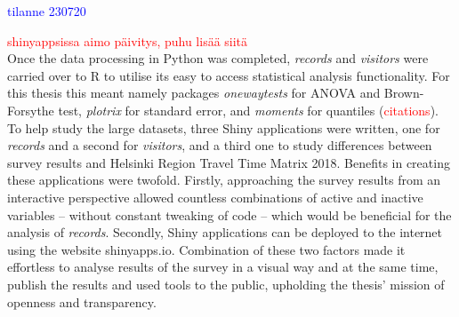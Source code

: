 \textcolor{blue}{tilanne 230720}

\textcolor{red}{shinyappsissa aimo päivitys, puhu lisää siitä} \\
Once the data processing in Python was completed, \textit{records} and \textit{visitors} were carried over to R to utilise its easy to access statistical analysis functionality. For this thesis this meant namely packages \textit{onewaytests} for ANOVA and Brown-Forsythe test, \textit{plotrix} for standard error, and \textit{moments} for quantiles (\textcolor{red}{citations}). To help study the large datasets, three Shiny applications were written, one for \textit{records} and a second for \textit{visitors}, and a third one to study differences between survey results and Helsinki Region Travel Time Matrix 2018. Benefits in creating these applications were twofold. Firstly, approaching the survey results from an interactive perspective allowed countless combinations of active and inactive variables -- without constant tweaking of code -- which would be beneficial for the analysis of \textit{records}. Secondly, Shiny applications can be deployed to the internet using the website shinyapps.io. Combination of these two factors made it effortless to analyse results of the survey in a visual way and at the same time, publish the results and used tools to the public, upholding the thesis' mission of openness and transparency.

